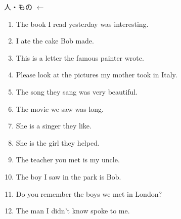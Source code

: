 \documentclass[aspectratio=169,xcolor={dvipsnames,table}]{beamer}
\begin{document}
\begin{frame}[plain,label=ichiran]{人・もの $\leftarrow$ }
 \begin{enumerate}
  \item The book  I read yesterday was interesting.%
\mbox{}\hfill{\scriptsize {}}
  \item I ate the cake  Bob made.
  \item This is a letter  the famous painter wrote.
  \item Please look at the pictures  my mother took in Italy.
  \item The song  they sang was very beautiful.
  \item The movie  we saw was long.
  \item She is a singer  they like.
  \item She is the girl  they helped.
  \item The teacher  you met is my uncle.
  \item The boy  I saw in the park is Bob.
  \item Do you remember the boys  we met in London?
  \item The man  I didn't know spoke to me.
 \end{enumerate}
\end{frame}
\end{document}
